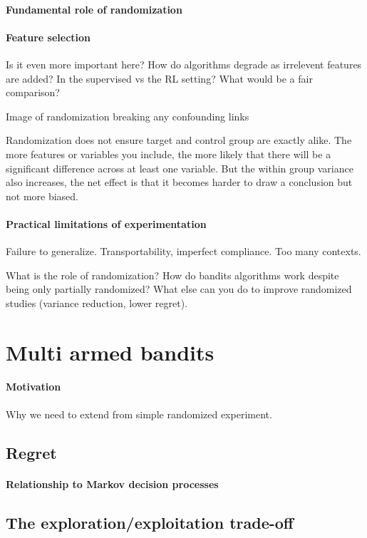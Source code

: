 \documentclass[11pt,a4paper,oneside]{book}
\begin{document}
\paragraph*{Fundamental role of randomization}


\paragraph*{Feature selection} Is it even more important here? How do algorithms degrade as irrelevent features are added? In the supervised vs the RL setting? What would be a fair comparison?

Image of randomization breaking any confounding links

Randomization does not ensure target and control group are exactly alike. The more features or variables you include, the more likely that there will be a significant difference across at least one variable. But the within group variance also increases, the net effect is that it becomes harder to draw a conclusion but not more biased. 

\paragraph*{Practical limitations of experimentation} Failure to generalize. Transportability, imperfect compliance. Too many contexts.

What is the role of randomization? How do bandits algorithms work despite being only partially randomized? 
What else can you do to improve randomized studies (variance reduction, lower regret).

\section*{Multi armed bandits}
\paragraph*{Motivation} Why we need to extend from simple randomized experiment.

\subsection*{Regret}
\paragraph*{Relationship to Markov decision processes}
\subsection*{The exploration/exploitation trade-off}
\end{document}
